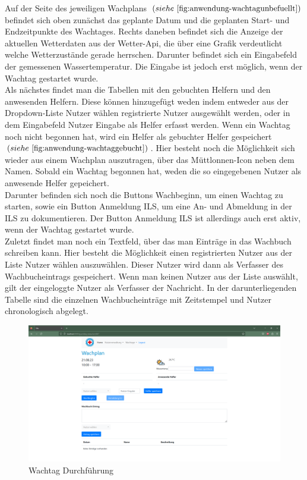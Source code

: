 \documentclass[fontsize=12pt,openright,oneside,paper=a4,BCOR=1cm]{scrbook}
\begin{document}
Auf der Seite des jeweiligen Wachplans $(siehe~\ref{fig:anwendung-wachtagunbefuellt})$ befindet sich oben zun\"achst das geplante Datum und die geplanten Start- und Endzeitpunkte des Wachtages. Rechts daneben befindet sich die Anzeige der aktuellen Wetterdaten aus der Wetter-Api, die \"uber eine Grafik verdeutlicht welche Wetterzust\"ande gerade herrschen. Darunter befindet sich ein Eingabefeld der gemessenen Wassertemperatur. Die Eingabe ist jedoch erst m\"oglich, wenn der Wachtag gestartet wurde. \\
Als n\"achstes findet man die Tabellen mit den gebuchten Helfern und den anwesenden Helfern. Diese k\"onnen hinzugef\"ugt weden indem entweder aus der Dropdown-Liste \glqq Nutzer w\"ahlen\grqq{} registrierte Nutzer ausgew\"ahlt werden, oder in dem Eingabefeld \glqq Nutzer Eingabe\grqq{} als Helfer erfasst werden. Wenn ein Wachtag noch nicht begonnen hat, wird ein Helfer als gebuchter Helfer gespeichert $(siehe~\ref{fig:anwendung-wachtaggebucht})$. Hier besteht noch die M\"oglichkeit sich wieder aus einem Wachplan auszutragen, \"uber das M\"uttlonnen-Icon neben dem Namen. Sobald ein Wachtag begonnen hat, weden die so eingegebenen Nutzer als anwesende Helfer gepeichert. \\
Darunter befinden sich noch die Buttons \glqq Wachbeginn\grqq{}, um einen Wachtag zu starten, sowie ein Button \glqq Anmeldung ILS\grqq{}, um eine An- und Abmeldung in der ILS zu dokumentieren. Der Button \glqq Anmeldung ILS\grqq{} ist allerdings auch erst aktiv, wenn der Wachtag gestartet wurde. \\
Zuletzt findet man noch ein Textfeld, \"uber das man Eintr\"age in das Wachbuch schreiben kann. Hier besteht die M\"oglichkeit einen registrierten Nutzer aus der Liste \glqq Nutzer w\"ahlen\grqq{} auszuw\"ahlen. Dieser Nutzer wird dann als Verfasser des Wachbucheintrags gespeichert. Wenn man keinen Nutzer aus der Liste ausw\"ahlt, gilt der eingeloggte Nutzer als Verfasser der Nachricht. In der darunterliegenden Tabelle sind die einzelnen Wachbucheintr\"age mit Zeitstempel und Nutzer chronologisch abgelegt.

\begin{figure}[H]
  \centering
    \includegraphics[width=0.7\linewidth]{Anlagen/Anwendung/8WachtagUnbefuellt.png}
    \caption{Wachtag Durchf\"uhrung}
  \label{fig:anwendung-wachtagunbefuellt}
\end{figure}
\end{document}
